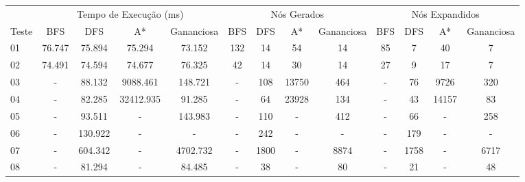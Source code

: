 \documentclass[12pt,a4paper]{article}
\begin{document}
\begin{adjustbox}{width={\textwidth}, totalheight={\textheight}, keepaspectratio}
  \begin{tabular}{l cccc cccc cccc}
    \toprule
          & \multicolumn{4}{c}{Tempo de Execução (ms)} & \multicolumn{4}{c}{Nós Gerados} & \multicolumn{4}{c}{Nós Expandidos}                                                                                  \\
    \cmidrule(lr){2-5} \cmidrule(lr){6-9} \cmidrule(lr){10-13}
    Teste & BFS                                        & DFS                             & A*                                 & Gananciosa & BFS & DFS  & A*    & Gananciosa & BFS & DFS  & A*    & Gananciosa \\
    \midrule
    01    & 76.747                                     & 75.894                          & 75.294                             & 73.152     & 132 & 14   & 54    & 14         & 85  & 7    & 40    & 7          \\
    02    & 74.491                                     & 74.594                          & 74.677                             & 76.325     & 42  & 14   & 30    & 14         & 27  & 9    & 17    & 7          \\
    03    & -                                          & 88.132                          & 9088.461                           & 148.721    & -   & 108  & 13750 & 464        & -   & 76   & 9726  & 320        \\
    04    & -                                          & 82.285                          & 32412.935                          & 91.285     & -   & 64   & 23928 & 134        & -   & 43   & 14157 & 83         \\
    05    & -                                          & 93.511                          & -                                  & 143.983    & -   & 110  & -     & 412        & -   & 66   & -     & 258        \\
    06    & -                                          & 130.922                         & -                                  & -          & -   & 242  & -     & -          & -   & 179  & -     & -          \\
    07    & -                                          & 604.342                         & -                                  & 4702.732   & -   & 1800 & -     & 8874       & -   & 1758 & -     & 6717       \\
    08    & -                                          & 81.294                          & -                                  & 84.485     & -   & 38   & -     & 80         & -   & 21   & -     & 48         \\

\end{tabular}
\end{adjustbox}
\end{document}
